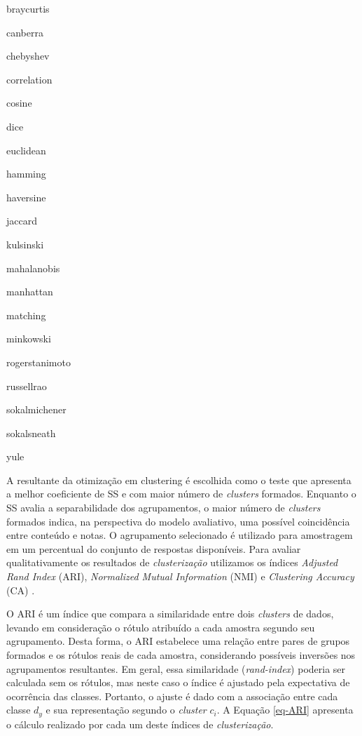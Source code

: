 \begin{itemize}
\begin{multicols}{4}
  \item braycurtis
  \item canberra
  \item chebyshev
  \item correlation
  \item cosine
  \item dice
  \item euclidean
  \item hamming
  \item haversine
  \item jaccard
  \item kulsinski
  \item mahalanobis
  \item manhattan
  \item matching
  \item minkowski
  \item rogerstanimoto
  \item russellrao
  \item sokalmichener
  \item sokalsneath
  \item yule
  \end{multicols}
\end{itemize}

A resultante da otimização em clustering é escolhida como o teste que apresenta a melhor coeficiente de SS e com maior número de \textit{clusters} formados. Enquanto o SS avalia a separabilidade dos agrupamentos, o maior número de \textit{clusters} formados indica, na perspectiva do modelo avaliativo, uma possível coincidência entre conteúdo e notas. O agrupamento selecionado é utilizado para amostragem em um percentual do conjunto de respostas disponíveis. Para avaliar qualitativamente os resultados de \textit{clusterização} utilizamos os índices \textit{Adjusted Rand Index} (ARI), \textit{Normalized Mutual Information} (NMI) e \textit{Clustering Accuracy} (CA) \cite{spalenza2019}.

O ARI é um índice que compara a similaridade entre dois \textit{clusters} de dados, levando em consideração o rótulo atribuído a cada amostra segundo seu agrupamento. Desta forma, o ARI estabelece uma relação entre pares de grupos formados e os rótulos reais de cada amostra, considerando possíveis inversões nos agrupamentos resultantes. Em geral, essa similaridade (\textit{rand-index}) poderia ser calculada sem os rótulos, mas neste caso o índice é ajustado pela expectativa de ocorrência das classes. Portanto, o ajuste é dado com a associação entre cada classe $ d_{y} $ e sua representação segundo o \textit{cluster} $ c_{i} $. A Equação \ref{eq-ARI} apresenta o cálculo realizado por cada um deste índices de \textit{clusterização}.

